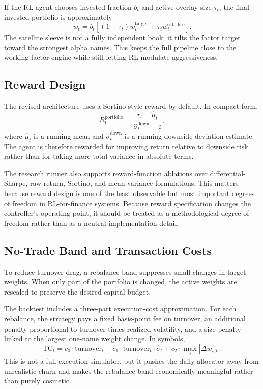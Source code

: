 \documentclass[11pt]{article}
\begin{document}
If the RL agent chooses invested fraction $b_t$ and active overlay size $\tau_t$,
the final invested portfolio is approximately
\[
w_t =
b_t \left[(1-\tau_t)w_t^{\text{target}} + \tau_t w_t^{\text{satellite}}\right].
\]
The satellite sleeve is not a fully independent book; it tilts the factor target
toward the strongest alpha names. This keeps the full pipeline close to the
working factor engine while still letting RL modulate aggressiveness.

\subsection{Reward Design}

The revised architecture uses a Sortino-style reward by default. In compact
form,
\[
R_t^{\mathrm{portfolio}}
= \frac{r_t - \hat{\mu}_t}{\hat{\sigma}^{\mathrm{down}}_t + \varepsilon},
\]
where $\hat{\mu}_t$ is a running mean and
$\hat{\sigma}^{\mathrm{down}}_t$ is a running downside-deviation estimate. The
agent is therefore rewarded for improving return relative to downside risk
rather than for taking more total variance in absolute terms.

The research runner also supports reward-function ablations over
differential-Sharpe, raw-return, Sortino, and mean-variance formulations. This
matters because reward design is one of the least observable but most important
degrees of freedom in RL-for-finance systems. Because reward specification
changes the controller's operating point, it should be treated as a
methodological degree of freedom rather than as a neutral implementation detail.

\subsection{No-Trade Band and Transaction Costs}

To reduce turnover drag, a rebalance band suppresses small changes in target
weights. When only part of the portfolio is changed, the active weights are
rescaled to preserve the desired capital budget.

The backtest includes a three-part execution-cost approximation. For each
rebalance, the strategy pays a fixed basis-point fee on turnover, an additional
penalty proportional to turnover times realized volatility, and a size penalty
linked to the largest one-name weight change. In symbols,
\[
\mathrm{TC}_t
= c_0 \cdot \mathrm{turnover}_t
+ c_1 \cdot \mathrm{turnover}_t \cdot \hat{\sigma}_t
+ c_2 \cdot \max_i |\Delta w_{i,t}|.
\]
This is not a full execution simulator, but it pushes the daily allocator away
from unrealistic churn and makes the rebalance band economically meaningful
rather than purely cosmetic.
\end{document}
